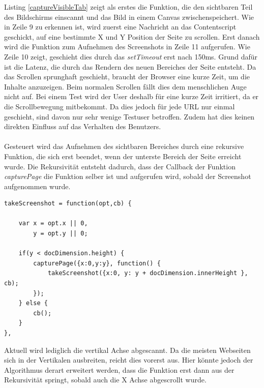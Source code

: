 Listing \ref{captureVisibleTab} zeigt als erstes die Funktion, die den sichtbaren Teil des Bildschirms einscannt und das Bild in einem Canvas zwischenspeichert. Wie in Zeile 9 zu erkennen ist, wird zuerst eine Nachricht an das Contentscript geschickt, auf eine bestimmte X und Y Position der Seite zu scrollen. Erst danach wird die Funktion zum Aufnehmen des Screenshots in Zeile 11 aufgerufen. Wie Zeile 10 zeigt, geschieht dies durch das \textit{setTimeout} erst nach 150ms. Grund dafür ist die \Gls{Latenz}, die durch das Rendern des neuen Bereiches der Seite entsteht. Da das Scrollen sprunghaft geschieht, braucht der Browser eine kurze Zeit, um die Inhalte anzuzeigen. Beim normalen Scrollen fällt dies dem menschlichen Auge nicht auf. Bei einem Test wird der User deshalb für eine kurze Zeit irritiert, da er die Scrollbewegung mitbekommt. Da dies jedoch für jede URL nur einmal geschieht, sind davon nur sehr wenige Testuser betroffen. Zudem hat dies keinen direkten Einfluss auf das Verhalten des Benutzers.\\
\\
Gesteuert wird das Aufnehmen des sichtbaren Bereiches durch eine rekursive Funktion, die sich erst beendet, wenn der unterste Bereich der Seite erreicht wurde. Die Rekursivität entsteht dadurch, dass der Callback der Funktion \textit{capturePage} die Funktion selber ist und aufgerufen wird, sobald der Screenshot aufgenommen wurde.
\\
\begin{lstlisting}[caption=Rekursive Funktion die das Abscannen der Seite steuert,label=takeScreenshot]
takeScreenshot = function(opt,cb) {

    var x = opt.x || 0,
        y = opt.y || 0;

    if(y < docDimension.height) {
        capturePage({x:0,y:y}, function() {
            takeScreenshot({x:0, y: y + docDimension.innerHeight }, cb);
        });
    } else {
        cb();
    }
},
\end{lstlisting}
\vspace{0,5cm}

Aktuell wird lediglich die vertikal Achse abgescannt. Da die meisten Webseiten sich in der Vertikalen ausbreiten, reicht dies vorerst aus. Hier könnte jedoch der Algorithmus derart erweitert werden, dass die Funktion erst dann aus der Rekursivität springt, sobald auch die X Achse abgescrollt wurde.
